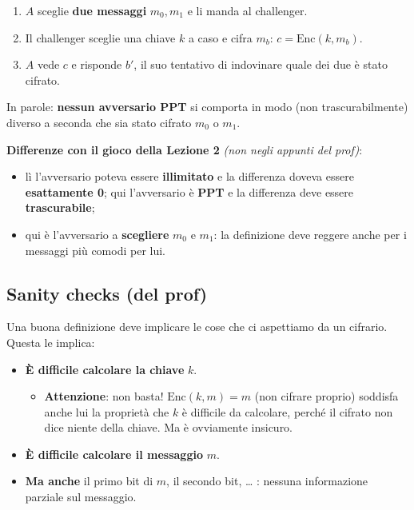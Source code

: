 \begin{enumerate}
\def\labelenumi{\arabic{enumi}.}
\tightlist
\item
  \(A\) sceglie \textbf{due messaggi} \(m_0, m_1\) e li manda al challenger.
\item
  Il challenger sceglie una chiave \(k\) a caso e cifra \(m_b\): \(c = \text{Enc}(k, m_b)\).
\item
  \(A\) vede \(c\) e risponde \(b'\), il suo tentativo di indovinare quale dei due è stato cifrato.
\end{enumerate}

In parole: \textbf{nessun avversario PPT} si comporta in modo (non trascurabilmente) diverso a seconda che sia stato cifrato \(m_0\) o \(m_1\).

\begin{nota}

\textbf{Differenze con il gioco della Lezione 2} \emph{(non negli appunti del prof)}:

\begin{itemize}
\tightlist
\item
  lì l'avversario poteva essere \textbf{illimitato} e la differenza doveva essere \textbf{esattamente 0}; qui l'avversario è \textbf{PPT} e la differenza deve essere \textbf{trascurabile};
\item
  qui è l'avversario a \textbf{scegliere} \(m_0\) e \(m_1\): la definizione deve reggere anche per i messaggi più comodi per lui.
\end{itemize}

\end{nota}

\subsection{Sanity checks (del prof)}

Una buona definizione deve implicare le cose che ci aspettiamo da un cifrario. Questa le implica:

\begin{itemize}
\tightlist
\item
  \textbf{È difficile calcolare la chiave} \(k\).

  \begin{itemize}
  \tightlist
  \item
    \textbf{Attenzione}: non basta! \(\text{Enc}(k, m) = m\) (non cifrare proprio) soddisfa anche lui la proprietà che \(k\) è difficile da calcolare, perché il cifrato non dice niente della chiave. Ma è ovviamente insicuro.
  \end{itemize}
\item
  \textbf{È difficile calcolare il messaggio} \(m\).
\item
  \textbf{Ma anche} il primo bit di \(m\), il secondo bit, \ldots{} : nessuna informazione parziale sul messaggio.
\end{itemize}


